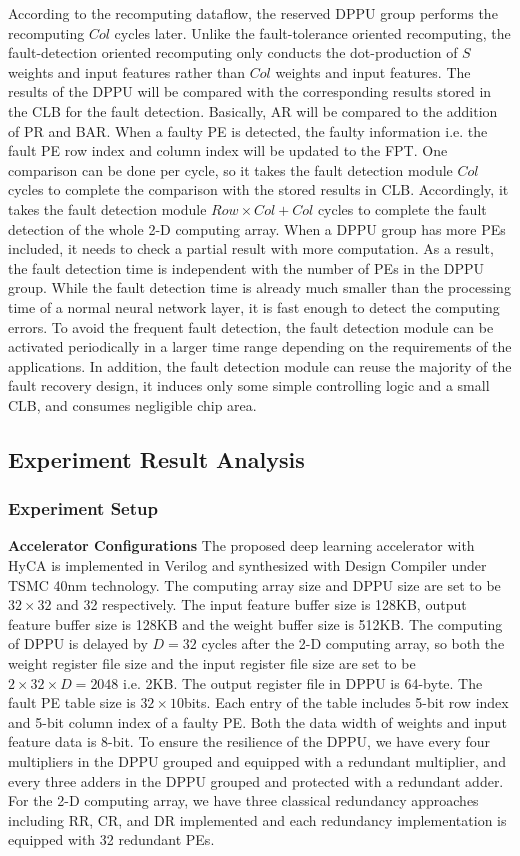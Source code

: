 According to the recomputing dataflow, the reserved DPPU group performs the recomputing $Col$ cycles later. Unlike the fault-tolerance oriented recomputing, the fault-detection oriented recomputing only conducts the dot-production of $S$ weights and input features rather than $Col$ weights and input features. The results of the DPPU will be compared with the corresponding results stored in the CLB for the fault detection. Basically, AR will be compared to the addition of PR and BAR. When a faulty PE is detected, the faulty information i.e. the fault PE row index and column index will be updated to the FPT. One comparison can be done per cycle, so it takes the fault detection module $Col$ cycles to complete the comparison with the stored results in CLB. Accordingly, it takes the fault detection module $Row \times Col + Col$ cycles to complete the fault detection of the whole 2-D computing array. When a DPPU group has more PEs included, it needs to check a partial result with more computation. As a result, the fault detection time is independent with the number of PEs in the DPPU group. While the fault detection time is already much smaller than the processing time of a normal neural network layer, it is fast enough to detect the computing errors. To avoid the frequent fault detection, the fault detection module can be activated periodically in a larger time range depending on the requirements of the applications. In addition, the fault detection module can reuse the majority of the fault recovery design, it induces only some simple controlling logic and a small CLB, and consumes negligible chip area.

\subsection{Experiment Result Analysis}\label{sec:exp_result}
\subsubsection{Experiment Setup}
\textbf{Accelerator Configurations} The proposed deep learning accelerator with HyCA is implemented in Verilog and synthesized with Design Compiler under TSMC 40nm technology. The computing array size and DPPU size are set to be $32\times 32$ and 32 respectively. The input feature buffer size is 128KB, output feature buffer size is 128KB and the weight buffer size is 512KB. The computing of DPPU is delayed by $D=32$ cycles after the 2-D computing array, so both the weight register file size and the input register file size are set to be $2 \times 32 \times D = 2048$ i.e. 2KB. The output register file in DPPU is 64-byte. The fault PE table size is $32 \times 10$bits. Each entry of the table includes 5-bit row index and 5-bit column index of a faulty PE. Both the data width of weights and input feature data is 8-bit. To ensure the resilience of the DPPU, we have every four multipliers in the DPPU grouped and equipped with a redundant multiplier, and every three adders in the DPPU grouped and protected with a redundant adder. For the 2-D computing array, we have three classical redundancy approaches including RR, CR, and DR implemented and each redundancy implementation is equipped with 32 redundant PEs.

